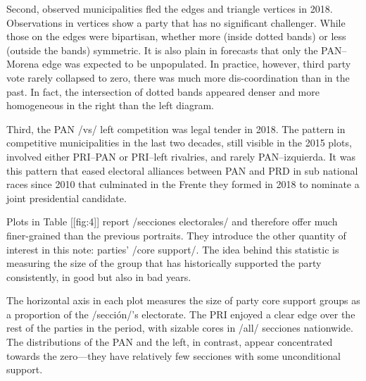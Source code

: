 \documentclass[letter,12pt]{article}
\begin{document}
Second, observed municipalities fled the edges and triangle vertices in 2018. Observations in vertices show a party that has no significant challenger. While those on the edges were bipartisan, whether more (inside dotted bands) or less (outside the bands) symmetric. It is also plain in forecasts that only the PAN--Morena edge was expected to be unpopulated. In practice, however, third party vote rarely collapsed to zero, there was much more dis-coordination than in the past. In fact, the intersection of dotted bands appeared denser and more homogeneous in the right than the left diagram. 

Third, the PAN /vs/ left competition was legal tender in 2018. The pattern in competitive municipalities in the last two decades, still visible in the 2015 plots, involved either PRI--PAN or PRI--left rivalries, and rarely PAN--izquierda. It was this pattern that eased electoral alliances between PAN and PRD in sub national races since 2010 that culminated in the Frente they formed in 2018 to nominate a joint presidential candidate. 




Plots in Table [[fig:4]] report /secciones electorales/ and therefore offer much finer-grained than the previous portraits. They introduce the other quantity of interest in this note: parties' /core support/. The idea behind this statistic is measuring the size of the group that has historically supported the party consistently, in good but also in bad years. 


The horizontal axis in each plot measures the size of party core support groups as a proportion of the /sección/'s electorate. The PRI enjoyed a clear edge over the rest of the parties in the period, with sizable cores in /all/ secciones nationwide. The distributions of the PAN and the left, in contrast, appear concentrated towards the zero---they have relatively few secciones with some unconditional support. 
\end{document}
